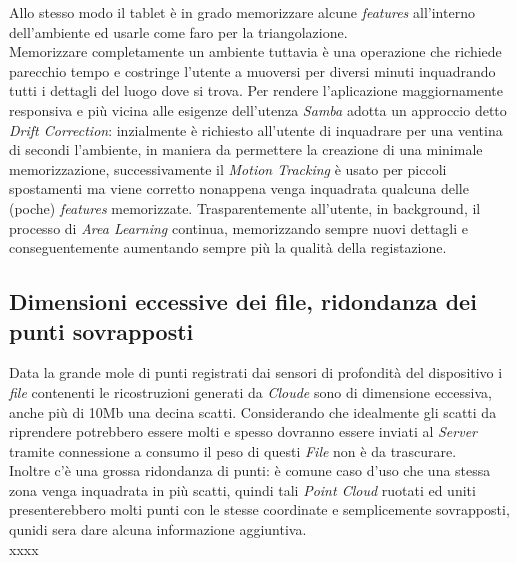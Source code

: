 Allo stesso modo il tablet è in grado memorizzare alcune \emph{features} all'interno dell'ambiente ed usarle come faro per la triangolazione. \\
Memorizzare completamente un ambiente tuttavia è una operazione che richiede parecchio tempo e costringe l'utente a muoversi per diversi minuti inquadrando tutti i dettagli del luogo dove si trova. Per rendere l'aplicazione maggiornamente responsiva e più vicina alle esigenze dell'utenza \emph{Samba} adotta un approccio detto \emph{Drift Correction}: inzialmente è richiesto all'utente di inquadrare per una ventina di secondi l'ambiente, in maniera da permettere la creazione di una minimale memorizzazione, successivamente il \emph{Motion Tracking} è usato per piccoli spostamenti ma viene corretto nonappena venga inquadrata qualcuna delle (poche) \emph{features} memorizzate. Trasparentemente all'utente, in background, il processo di \emph{Area Learning} continua, memorizzando sempre nuovi dettagli e conseguentemente aumentando sempre più la qualità della registazione.\\

\subsection{Dimensioni eccessive dei file, ridondanza dei punti sovrapposti}
Data la grande mole di punti registrati dai sensori di profondità del dispositivo i \emph{file} contenenti le ricostruzioni generati da \emph{Cloude} sono di dimensione eccessiva, anche più di 10Mb una decina scatti.
Considerando che idealmente gli scatti da riprendere potrebbero essere molti e spesso dovranno essere inviati al \emph{Server} tramite connessione a consumo il peso di questi \emph{File} non è da trascurare.\\
Inoltre c'è una grossa ridondanza di punti: è comune caso d'uso che una stessa zona venga inquadrata in più scatti, quindi tali \emph{Point Cloud} ruotati ed uniti presenterebbero molti punti con le stesse coordinate e semplicemente sovrapposti, qunidi sera dare alcuna informazione aggiuntiva.\\
xxxx





